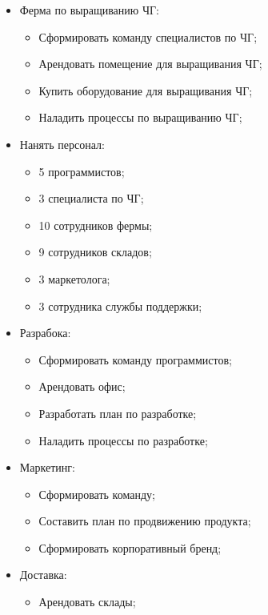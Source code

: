 \documentclass[a4paper,10pt]{article}
\begin{document}
    \begin{itemize}
        \item Ферма по выращиванию ЧГ:
            \begin{itemize}
                \item Сформировать команду специалистов по ЧГ;
                \item Арендовать помещение для выращивания ЧГ;
                \item Купить оборудование для выращивания ЧГ;
                \item Наладить процессы по выращиванию ЧГ;
            \end{itemize}
        \item Нанять персонал:
            \begin{itemize}
                \item 5 программистов;
                \item 3 специалиста по ЧГ;
                \item 10 сотрудников фермы;
                \item 9 сотрудников складов;
                \item 3 маркетолога;
                \item 3 сотрудника службы поддержки;
            \end{itemize}
        \item Разрабока:
            \begin{itemize}
                \item Сформировать команду программистов;
                \item Арендовать офис;
                \item Разработать план по разработке;
                \item Наладить процессы по разработке;
            \end{itemize}
        \item Маркетинг:
            \begin{itemize}
                \item Сформировать команду;
                \item Составить план по продвижению продукта;
                \item Сформировать корпоративный бренд;
            \end{itemize}
        \item Доставка:
            \begin{itemize}
                \item Арендовать склады;

\end{itemize}
\end{itemize}
\end{document}
